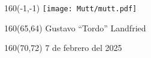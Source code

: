 \documentclass[shownotes,aspectratio=169]{beamer}
\begin{document}
\color{black!85}
\large
%
%
%
%
%
%
%
%
%
%



\begin{frame}

\begin{textblock}{160}(-1,-1)
\texttt{[image: Mutt/mutt.pdf]}
\end{textblock}

\begin{textblock}{160}(65,64)
 \large Gustavo ``Tordo'' Landfried
\end{textblock}

\begin{textblock}{160}(70,72)
 \large 7 de febrero del 2025
\end{textblock}

\end{frame}
\end{document}
